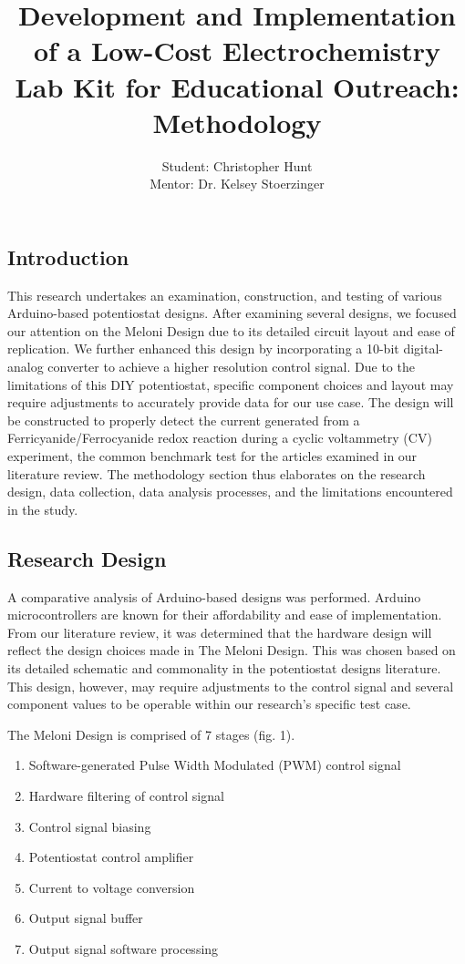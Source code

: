 \documentclass{article}
\title{\textcolor{mycolor}{\textbf{{\huge Development and Implementation of a Low-Cost Electrochemistry Lab Kit for Educational Outreach: Methodology}}}}
\author{Student: Christopher Hunt \\ Mentor: Dr. Kelsey Stoerzinger}
\date{}
\begin{document}
\pagestyle{fancy}
\fancyhf{}
\rfoot{}
\rhead{\thepage}
\maketitle
\subsection*{Introduction}
This research undertakes an examination, construction, and testing of various Arduino-based potentiostat designs. After examining several designs, we focused our attention on the Meloni Design due to its detailed circuit layout and ease of replication. We further enhanced this design by incorporating a 10-bit digital-analog converter to achieve a higher resolution control signal. Due to the limitations of this DIY potentiostat, specific component choices and layout may require adjustments to accurately provide data for our use case. The design will be constructed to properly detect the current generated from a Ferricyanide/Ferrocyanide redox reaction during a cyclic voltammetry (CV) experiment, the common benchmark test for the articles examined in our literature review. The methodology section thus elaborates on the research design, data collection, data analysis processes, and the limitations encountered in the study.

\subsection*{Research Design}
A comparative analysis of Arduino-based designs was performed. Arduino microcontrollers are known for their affordability and ease of implementation. From our literature review, it was determined that the hardware design will reflect the design choices made in The Meloni Design. This was chosen based on its detailed schematic and commonality in the potentiostat designs literature. This design, however, may require adjustments to the control signal and several component values to be operable within our research's specific test case.

The Meloni Design is comprised of 7 stages (fig. 1).
\begin{enumerate}
    \item Software-generated Pulse Width Modulated (PWM) control signal
    \item Hardware filtering of control signal
    \item Control signal biasing
    \item Potentiostat control amplifier
    \item Current to voltage conversion
    \item Output signal buffer
    \item Output signal software processing
\end{enumerate}
\end{document}
